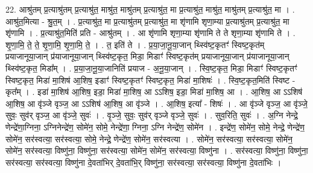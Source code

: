 \documentclass[17pt]{extarticle}
\begin{document}
22. आश्रु॑तम् प्र॒त्याश्रु॑तम् प्र॒त्याश्रु॑त॒ माश्रु॑त॒ माश्रु॑तम् प्र॒त्याश्रु॑त॒ मा प्र॒त्याश्रु॑त॒ माश्रु॑त॒ माश्रु॑तम् प्र॒त्याश्रु॑त॒ मा । . आश्रु॑त॒मित्या - श्रु॒त॒म् । . प्र॒त्याश्रु॑त॒ मा प्र॒त्याश्रु॑तम् प्र॒त्याश्रु॑त॒ मा शृ॑णामि शृणा॒म्या प्र॒त्याश्रु॑तम् प्र॒त्याश्रु॑त॒ मा शृ॑णामि । . प्र॒त्याश्रु॑त॒मिति॑ प्रति - आश्रु॑तम् । . आ शृ॑णामि शृणा॒म्या शृ॑णामि ते ते शृणा॒म्या शृ॑णामि ते । . शृ॒णा॒मि॒ ते॒ ते॒ शृ॒णा॒मि॒ शृ॒णा॒मि॒ ते॒ । . त॒ इति॑ ते । . प्र॒या॒जा॒नू॒या॒जान् थ्स्वि॑ष्ट॒कृतꣳ॑ स्विष्ट॒कृत॑म् प्रयाजानूया॒जान् प्र॑याजानूया॒जान् थ्स्वि॑ष्ट॒कृत॒ मिडा॒ मिडाꣳ॑ स्विष्ट॒कृत॑म् प्रयाजानूया॒जान् प्र॑याजानूया॒जान् थ्स्वि॑ष्ट॒कृत॒ मिडा᳚म् । . प्र॒या॒जा॒नू॒या॒जानिति॑ प्रयाज - अ॒नू॒या॒जान् । . स्वि॒ष्ट॒कृत॒ मिडा॒ मिडाꣳ॑ स्विष्ट॒कृतꣳ॑ स्विष्ट॒कृत॒ मिडा॑ मा॒शिष॑ आ॒शिष॒ इडाꣳ॑ स्विष्ट॒कृतꣳ॑ स्विष्ट॒कृत॒ मिडा॑ मा॒शिषः॑ । . स्वि॒ष्ट॒कृत॒मिति॑ स्विष्ट - कृत᳚म् । . इडा॑ मा॒शिष॑ आ॒शिष॒ इडा॒ मिडा॑ मा॒शिष॒ आ ऽऽशिष॒ इडा॒ मिडा॑ मा॒शिष॒ आ । . आ॒शिष॒ आ ऽऽशिष॑ आ॒शिष॒ आ वृ॑ञ्जे वृञ्ज॒ आ ऽऽशिष॑ आ॒शिष॒ आ वृ॑ञ्जे । . आ॒शिष॒ इत्या᳚ - शिषः॑ । . आ वृ॑ञ्जे वृञ्ज॒ आ वृ॑ञ्जे॒ सुवः॒ सुव॑र् वृञ्ज॒ आ वृ॑ञ्जे॒ सुवः॑ । . वृ॒ञ्जे॒ सुवः॒ सुव॑र् वृञ्जे वृञ्जे॒ सुवः॑ । . सुव॒रिति॒ सुवः॑ । . अ॒ग्नि नेन्द्रे॒ णेन्द्रे॑णा॒ग्निना॒ ऽग्निनेन्द्रे॑ण॒ सोमे॑न॒ सोमे॒ नेन्द्रे॑णा॒ ग्निना॒ ऽग्नि नेन्द्रे॑ण॒ सोमे॑न । . इन्द्रे॑ण॒ सोमे॑न॒ सोमे॒ नेन्द्रे॒ णेन्द्रे॑ण॒ सोमे॑न॒ सर॑स्वत्या॒ सर॑स्वत्या॒ सोमे॒ नेन्द्रे॒ णेन्द्रे॑ण॒ सोमे॑न॒ सर॑स्वत्या । . सोमे॑न॒ सर॑स्वत्या॒ सर॑स्वत्या॒ सोमे॑न॒ सोमे॑न॒ सर॑स्वत्या॒ विष्णु॑ना॒ विष्णु॑ना॒ सर॑स्वत्या॒ सोमे॑न॒ सोमे॑न॒ सर॑स्वत्या॒ विष्णु॑ना । . सर॑स्वत्या॒ विष्णु॑ना॒ विष्णु॑ना॒ सर॑स्वत्या॒ सर॑स्वत्या॒ विष्णु॑ना दे॒वता॑भिर् दे॒वता॑भि॒र् विष्णु॑ना॒ सर॑स्वत्या॒ सर॑स्वत्या॒ विष्णु॑ना दे॒वता॑भिः । \newline
\end{document}
